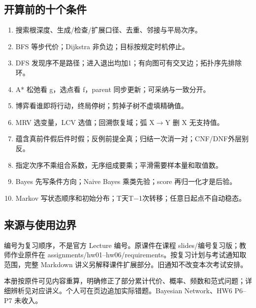 \subsection*{开算前的十个条件}
\begin{enumerate}
\item 搜索根深度、生成/检查/扩展口径、去重、邻接与平局次序。
\item BFS 等步代价；Dijkstra 非负边；目标按规定时机停止。
\item DFS 发现序不是路径；进入退出均加1；有向图可有交叉边；拓扑序先排除环。
\item A* 松弛看 g，选点看 f，parent 同步更新；可采纳与一致分开。
\item 博弈看谁即将行动，终局停树；剪掉子树不虚填精确值。
\item MRV 选变量，LCV 选值；回溯恢复域；弧 X$\to$Y 删 X 无支持值。
\item 蕴含真前件假后件时假；反例前提全真；归结一次消一对；CNF/DNF外层别反。
\item 指定次序不乘组合系数，无序组成要乘；平滑需要样本量和取值数。
\item Bayes 先写条件方向；Naive Bayes 乘类先验；score 再归一化才是后验。
\item Markov 写状态顺序和初始分布；T天T$-$1次转移；任意日起点不自动稳态。
\end{enumerate}
\subsection*{来源与使用边界}
编号为复习顺序，不是官方 Lecture 编号。原课件在课程 slides/编号复习版；教师作业原件在 assignments/hw01--hw06/requirements。按复习计划与考试通知取范围，完整 Markdown 讲义另解释课件扩展部分。旧通知不改变本次考试安排。

本册按原件可见内容重算，明确修正了部分累计代价、概率、频数和范式问题；详细辨析见对应讲义。个人可在页边追加实际错题。Bayesian Network、HW6 P6--P7 未收入。
